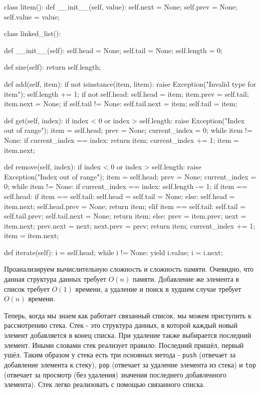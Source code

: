 \begin{python}
class litem():
	def __init__(self, value):
		self.next = None;
		self.prev = None;
		self.value = value;

class linked_list():

	def __init__(self):
		self.head = None;
		self.tail = None;
		self.length = 0;

	def size(self):
		return self.length;

	def add(self, item):
		if not isinstance(item, litem):
			raise Exception("Invalid type for item");
		self.length += 1;
		if not self.head:
			self.head = item;
		item.prev = self.tail;
		item.next = None;
		if self.tail != None:
			self.tail.next = item;
		self.tail = item;

	def get(self, index):
		if index < 0 or index > self.length:
			raise Exception("Index out of range");
		item = self.head;
		prev = None;
		current_index = 0;
		while item != None:
			if current_index == index:
				return item;
			current_index += 1;
			item = item.next;

	def remove(self, index):
		if index < 0 or index > self.length:
			raise Exception("Index out of range");
		item = self.head;
		prev = None;
		current_index = 0;
		while item != None:
			if current_index == index:
				self.length -= 1;
				if item == self.head:
					if item == self.tail:
						self.head = self.tail = None;
					else:
						self.head = item.next;
						self.head.prev = None;
					return item;
				elif item == self.tail:
					self.tail = self.tail.prev;
					self.tail.next = None;
					return item;
				else:
					prev = item.prev;
					next = item.next;
					prev.next = next;
					next.prev = prev;
					return item;
			current_index += 1;
			item = item.next;

	def iterate(self):
		i = self.head;
		while i != None:
			yield i.value;
			i = i.next;
\end{python}

Проанализируем вычислительную сложность и сложность памяти. Очевидно, что
данная структура данных требует $O(n)$ памяти. Добавление же элемента в
список требует $O(1)$ времени, а удаление и поиск в худшем случае требует
$O(n)$ времени.

Теперь, когда мы знаем как работает связанный список, мы можем приступить 
к рассмотрению стека. Стек - это структура данных, в которой каждый 
новый элемент добавляется в конец списка. При удаление также выбирается
последний элемент. Иными словами стек реализует правило: Последний пришёл,
первый ушёл. Таким образом у стека есть три основных метода - \texttt{push} 
(отвечает за добавление элемента к стеку), \texttt{pop} (отвечает за удаление
элемента из стека) и \texttt{top} (отвечает за просмотр (без удаления) значения 
последнего добавленного элемента). Стек легко реализовать с помощью связанного 
списка.



